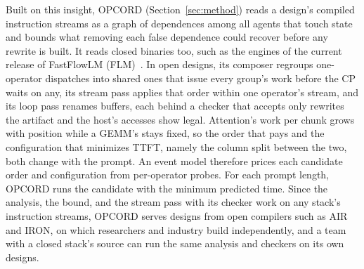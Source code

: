 Built on this insight, OPCORD (Section~\ref{sec:method}) reads a design's compiled instruction streams as a graph of dependences among all agents that touch state and bounds what removing each false dependence could recover before any rewrite is built.
It reads closed binaries too, such as the engines of the current release of FastFlowLM (FLM)~\citep{fastflowlm-repo}.
In open designs, its composer regroups one-operator dispatches into shared ones that issue every group's work before the CP waits on any, its stream pass applies that order within one operator's stream, and its loop pass renames buffers, each behind a checker that accepts only rewrites the artifact and the host's accesses show legal.
Attention's work per chunk grows with position while a GEMM's stays fixed, so the order that pays and the configuration that minimizes TTFT, namely the column split between the two, both change with the prompt.
An event model therefore prices each candidate order and configuration from per-operator probes.
For each prompt length, OPCORD runs the candidate with the minimum predicted time.
Since the analysis, the bound, and the stream pass with its checker work on any stack's instruction streams, OPCORD serves designs from open compilers such as AIR and IRON, on which researchers and industry build independently, and a team with a closed stack's source can run the same analysis and checkers on its own designs.

